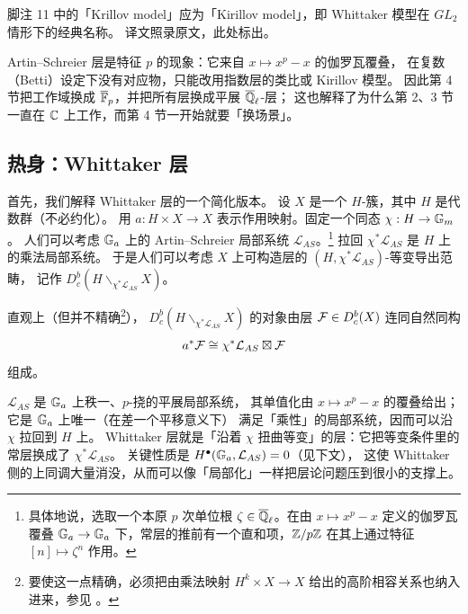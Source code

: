 \begin{yizhu}
脚注 11 中的「Krillov model」应为「Kirillov model」，即 Whittaker 模型在 $GL_2$ 情形下的经典名称。
译文照录原文，此处标出。
\end{yizhu}

\begin{yizhu}
Artin–Schreier 层是特征 $p$ 的现象：它来自 $x\mapsto x^p-x$ 的伽罗瓦覆叠，
在复数（Betti）设定下没有对应物，只能改用指数层的类比或 Kirillov 模型。
因此第 4 节把工作域换成 $\overline{\mathbb{F}}_p$，并把所有层换成平展 $\overline{\mathbb{Q}}_{\ell}$-层；
这也解释了为什么第 2、3 节一直在 $\mathbb{C}$ 上工作，而第 4 节一开始就要「换场景」。
\end{yizhu}

\subsection{热身：Whittaker 层}\label{sec:whittaker}

首先，我们解释 Whittaker 层的一个简化版本。
设 $X$ 是一个 $H$-簇，其中 $H$ 是代数群（不必约化）。
用 $a:H\times X\to X$ 表示作用映射。固定一个同态 $\chi:H\to\mathbb{G}_m$。
人们可以考虑 $\mathbb{G}_a$ 上的 Artin–Schreier 局部系统 $\mathcal{L}_{AS}$。\footnote{具体地说，选取一个本原 $p$ 次单位根 $\zeta\in\overline{\mathbb{Q}}_{\ell}$。在由 $x\mapsto x^p-x$ 定义的伽罗瓦覆叠 $\mathbb{G}_a\to\mathbb{G}_a$ 下，常层的推前有一个直和项，$\mathbb{Z}/p\mathbb{Z}$ 在其上通过特征 $[n]\mapsto\zeta^n$ 作用。}
拉回 $\chi^*\mathcal{L}_{AS}$ 是 $H$ 上的乘法局部系统。
于是人们可以考虑 $X$ 上可构造层的 $(H,\chi^*\mathcal{L}_{AS})$-等变导出范畴，
记作 $D^b_c(H\backslash_{\chi^*\mathcal{L}_{AS}}X)$。

直观上（但并不精确\footnote{要使这一点精确，必须把由乘法映射 $H^k\times X\to X$ 给出的高阶相容关系也纳入进来，参见 \cite{Gai2}。}），
$D^b_c(H\backslash_{\chi^*\mathcal{L}_{AS}}X)$ 的对象由层 $\mathcal{F}\in D^b_c(X)$
连同自然同构
\[
a^*\mathcal{F}\cong\chi^*\mathcal{L}_{AS}\boxtimes\mathcal{F}
\]
组成。

\begin{yizhu}
$\mathcal{L}_{AS}$ 是 $\mathbb{G}_a$ 上秩一、$p$-挠的平展局部系统，
其单值化由 $x\mapsto x^p-x$ 的覆叠给出；它是 $\mathbb{G}_a$ 上唯一（在差一个平移意义下）
满足「乘性」的局部系统，因而可以沿 $\chi$ 拉回到 $H$ 上。
Whittaker 层就是「沿着 $\chi$ 扭曲等变」的层：它把等变条件里的常层换成了 $\chi^*\mathcal{L}_{AS}$。
关键性质是 $H^\bullet(\mathbb{G}_a,\mathcal{L}_{AS})=0$（见下文），
这使 Whittaker 侧的上同调大量消没，从而可以像「局部化」一样把层论问题压到很小的支撑上。
\end{yizhu}


